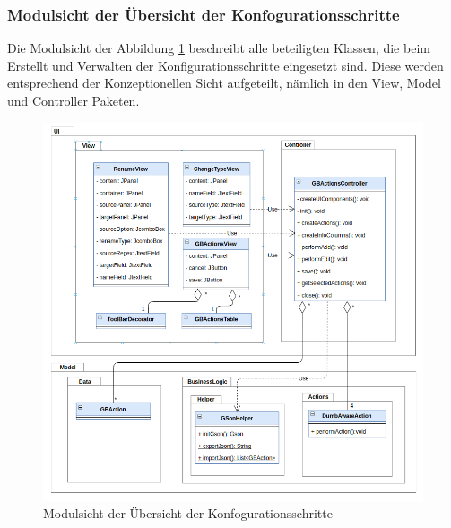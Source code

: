 	\subsubsection{Modulsicht der Übersicht der Konfogurationsschritte}
	Die Modulsicht der Abbildung \ref{img:modulsicht-gbactions} beschreibt alle beteiligten Klassen, die beim Erstellt und Verwalten der Konfigurationsschritte eingesetzt sind. Diese werden entsprechend der Konzeptionellen Sicht aufgeteilt, nämlich in den View, Model und Controller Paketen.\\
	\begin{figure}[H]
		\centering
		\includegraphics[width=\textwidth]{images/sichten/modulsicht-gbactions}
		\caption{Modulsicht der Übersicht der Konfogurationsschritte}
		\label{img:modulsicht-gbactions}
	\end{figure}

